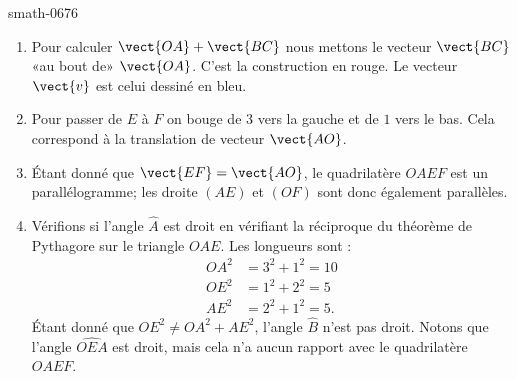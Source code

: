 
\begin{corrige}{smath-0676}

    \begin{center}
    
    \end{center}

\begin{enumerate}
    \item
        Pour calculer \( \vect{ OA }+\vect{ BC }\) nous mettons le vecteur \( \vect{ BC }\) «au bout de» \( \vect{ OA }\). C'est la construction en rouge. Le vecteur \( \vect{ v }\) est celui dessiné en bleu.
    \item
        Pour passer de \( E\) à \( F\) on bouge de \( 3\) vers la gauche et de \( 1\) vers le bas. Cela correspond à la translation de vecteur \( \vect{ AO }\).
    \item
        Étant donné que \( \vect{ EF }=\vect{ AO }\), le quadrilatère \( OAEF\) est un parallélogramme; les droite \( (AE)\) et \( (OF)\) sont donc également parallèles.
    \item
        Vérifions si l'angle \( \hat A\) est droit en vérifiant la réciproque du théorème de Pythagore sur le triangle \( OAE\). Les longueurs sont :
        \begin{subequations}
            \begin{align}
                OA^2&=3^2+1^2=10\\
                OE^2&=1^2+2^2=5\\
                AE^2&=2^2+1^2=5.
            \end{align}
        \end{subequations}
        Étant donné que \( OE^2\neq OA^2+AE^2\), l'angle \( \hat B\) n'est pas droit. Notons que l'angle \( \widehat{OEA}\) est droit, mais cela n'a aucun rapport avec le quadrilatère \( OAEF\).
\end{enumerate}

\end{corrige}
